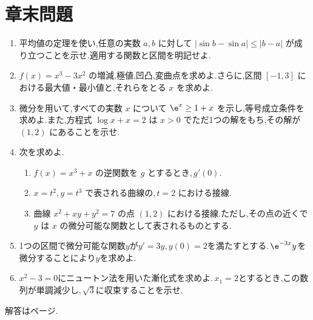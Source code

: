 \section*{章末問題}
\begin{enumerate}[label=\textbf{\thechapter.\arabic*},leftmargin=*]

 \item\label{問:平均値評価} 平均値の定理を使い,任意の実数 $a,b$ に対して $|\sin b-\sin a|\le|b-a|$ が成り立つことを示せ.適用する関数と区間を明記せよ.
 \item\label{問:三次関数グラフ} $f(x)=x^3-3x^2$ の増減,極値,凹凸,変曲点を求めよ.さらに,区間 $[-1,3]$ における最大値・最小値と,それらをとる $x$ を求めよ.
 \item\label{問:指数不等式方程式} 微分を用いて,すべての実数 $x$ について $\e^x\ge1+x$ を示し,等号成立条件を求めよ.また,方程式 $\log x+x=2$ は $x>0$ でただ1つの解をもち,その解が $(1,2)$ にあることを示せ.
 \item\label{問:逆媒介陰} 次を求めよ.
 \begin{enumerate}[label=(\arabic*),leftmargin=*]
  \item $f(x)=x^3+x$ の逆関数を $g$ とするとき,\,$g'(0)$.
  \item $x=t^2$,\,$y=t^3$ で表される曲線の,\,$t=2$ における接線.
  \item 曲線 $x^2+xy+y^2=7$ の点 $(1,2)$ における接線.ただし,その点の近くで $y$ は $x$ の微分可能な関数として表されるものとする.
 \end{enumerate}

 \item\label{問:微分方程式初期値} 1つの区間で微分可能な関数$y$が$y'=3y$,\,$y(0)=2$を満たすとする.\,$\e^{-3x}y$を微分することにより$y$を求めよ.

 \item\label{問:三平方根ニュートン} $x^2-3=0$にニュートン法を用いた漸化式を求めよ.\,$x_1=2$とするとき,この数列が単調減少し,\,$\sqrt3$に収束することを示せ.
\end{enumerate}
\smallskip\noindent 解答は\pageref{解答:第3章}ページ.
